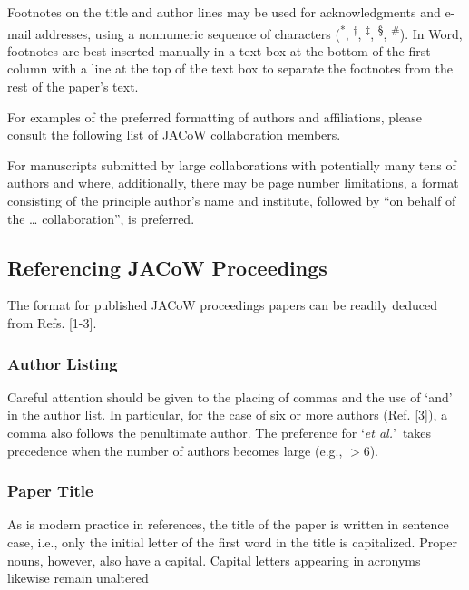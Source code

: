 \documentclass[letterpaper,  %
              ]{jacow-2_3}   %
\begin{document}
{{Footnotes on the title and author lines may be used for
acknowledgments and e-mail addresses, using a nonnumeric
sequence of characters (\textsuperscript{*}, \textsuperscript{†}, 
\textsuperscript{‡}, \textsuperscript{§}, \textsuperscript{\#}). In Word,
footnotes are best inserted manually in a text box at the
bottom of the first column with a line at the top of the text
box to separate the footnotes from the rest of the paper’s
text.

For examples of the preferred formatting of authors and
affiliations, please consult the following list of JACoW
collaboration members.

For manuscripts submitted by large collaborations with
potentially many tens of authors and where, additionally,
there may be page number limitations, a format consisting
of the principle author’s name and institute, followed by
“on behalf of the … collaboration”, is preferred.


\clearpage
%
%
{}

\clearpage



\subsection{Referencing JACoW Proceedings}

The format for published JACoW proceedings papers
can be readily deduced from Refs. [1-3].

\subsubsection{Author Listing} Careful attention should be given to the
placing of commas and the use of ‘and’ in the author list.
In particular, for the case of six or more authors
(Ref. [3]), a comma also follows the penultimate author.
The preference for ‘\emph{et al.}’\ takes precedence when the number
of authors becomes large (e.g., $>$6).

\subsubsection{Paper Title} As is modern practice in references, the title
of the paper is written in sentence case, i.e., only the
initial letter of the first word in the title is capitalized.
Proper nouns, however, also have a capital. Capital letters
appearing in acronyms likewise remain unaltered

}}
\end{document}
